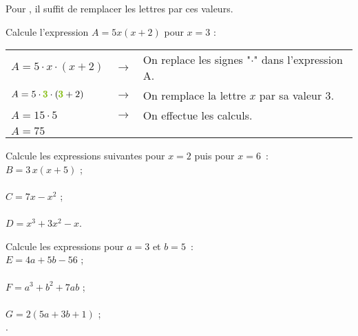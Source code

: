  
\begin{aconnaitre}
Pour , il suffit de remplacer les lettres par ces valeurs.
\end{aconnaitre}

\begin{methode*1}
 
\begin{exemple*1}
Calcule l'expression $A = 5x(x + 2)$ pour $x = 3$ :
\begin{center}
 \begin{tabular}{lcl}
$A = 5 \cdot x \cdot (x + 2)$ & $\longrightarrow$ & On replace les signes "$\cdot$" dans l'expression A. \\
$A = 5 \cdot \textcolor{H1}{\pmb{3}} \cdot (\textcolor{H1}{\pmb{3}} + 2)$ & $\longrightarrow$ & On remplace la lettre $x$ par sa valeur \textcolor{H1}{3}. \\ %
$A = 15 \cdot 5$ & $\longrightarrow$ &  On effectue les calculs. \\
$A= 75$ & &
  \end{tabular}
 \end{center}
\end{exemple*1}

\exercice  
Calcule les expressions suivantes pour $x = 2$ puis pour $x = 6$ :\\[1em]
$B = 3\,x(x + 5)$ \dotfill;\\

\dotfill \\[1em]
$C = 7x - x^2$ \dotfill;\\

\dotfill \\[1em]
$D = x^3 + 3x^2 - x$\dotfill.\\

\dotfill

\exercice  
Calcule les expressions pour $a = 3$ et $b = 5$ :\\[1em]     
$E = 4a + 5b - 56$ \dotfill;\\

\dotfill \\[1em]
$F = a^3 + b^2 + 7ab$ \dotfill;\\

\dotfill \\[1em]
$G = 2(5a + 3b + 1)$ \dotfill;\\.

\dotfill \\[1em]

\end{methode*1}
